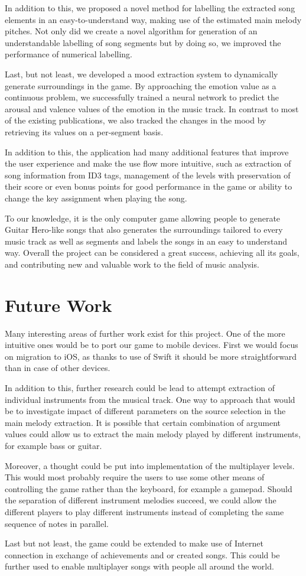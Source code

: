 In addition to this, we proposed a novel method for labelling the extracted song elements in an easy-to-understand way, making use of the estimated main melody pitches. Not only did we create a novel algorithm for generation of an understandable labelling of song segments but by doing so, we improved the performance of numerical labelling.

Last, but not least, we developed a mood extraction system to dynamically generate surroundings in the game. By approaching the emotion value as a continuous problem, we successfully trained a neural network to predict the arousal and valence values of the emotion in the music track. In contrast to most of the existing publications, we also tracked the changes in the mood by retrieving its values on a per-segment basis.

In addition to this, the application had many additional features that improve the user experience and make the use flow more intuitive, such as extraction of song information from ID3 tags, management of the levels with preservation of their score or even bonus points for good performance in the game or ability to change the key assignment when playing the song.

To our knowledge, it is the only computer game allowing people to generate Guitar Hero-like songs that also generates the surroundings tailored to every music track as well as segments and labels the songs in an easy to understand way. Overall the project can be considered a great success, achieving all its goals, and contributing new and valuable work to the field of music analysis.

\section{Future Work}

Many interesting areas of further work exist for this project. One of the more intuitive ones would be to port our game to mobile devices. First we would focus on migration to iOS, as thanks to use of Swift it should be more straightforward than in case of other devices. 

In addition to this, further research could be lead to attempt extraction of individual instruments from the musical track. One way to approach that would be to investigate impact of different parameters on the source selection in the main melody extraction. It is possible that certain combination of argument values could allow us to extract the main melody played by different instruments, for example bass or guitar. 

Moreover, a thought could be put into implementation of the multiplayer levels. This would most probably require the users to use some other means of controlling the game rather than the keyboard, for example a gamepad. Should the separation of different instrument melodies succeed, we could allow the different players to play different instruments instead of completing the same sequence of notes in parallel.

Last but not least, the game could be extended to make use of Internet connection in exchange of achievements and or created songs. This could be further used to enable multiplayer songs with people all around the world. 